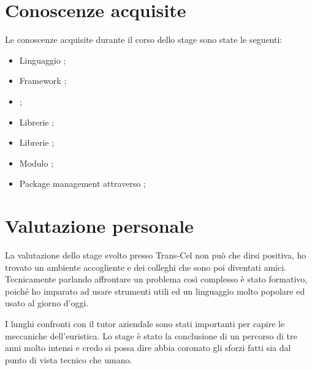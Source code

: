 \section{Conoscenze acquisite}
Le conoscenze acquisite durante il corso dello stage sono state le seguenti:
\begin{itemize}
	\item Linguaggio ;
	\item Framework ;
	\item {};
	\item Librerie ;
	\item Librerie ;
	\item Modulo ;
	\item Package management attraverso ;
\end{itemize}

\section{Valutazione personale}
La valutazione dello stage svolto presso Trans-Cel non può che dirsi positiva, ho trovato un ambiente accogliente e dei colleghi che sono poi diventati amici. Tecnicamente parlando affrontare un problema così complesso è stato formativo, poiché ho imparato ad usare strumenti utili ed un linguaggio molto popolare ed usato al giorno d'oggi.

I lunghi confronti con il tutor aziendale sono stati importanti per capire le meccaniche dell'euristica.
Lo stage è stato la conclusione di un percorso di tre anni molto intensi e credo si possa dire abbia coronato gli sforzi fatti sia dal punto di vista tecnico che umano.